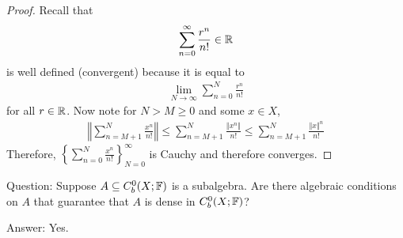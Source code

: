\documentclass{report}
\begin{document}
\begin{proof}
    Recall that 
    \begin{align*}
        \sum_{n=0}^\infty \frac{r^n}{n!} \in \RR
    \end{align*}
    is well defined (convergent) because it is equal to 
    \begin{align*}
        \lim_{N\to \infty} \sum_{n=0}^N \frac{r^n}{n!}
    \end{align*}
    for all $r \in \RR$. Now note for $N  > M \geq 0$ and some $x \in X$,
    \begin{align*}
        \left\Vert \sum_{n=M+1}^N  \frac{x^n}{n!} \right\Vert \leq \sum_{n=M+1}^N \frac{\Vert x^n \Vert}{n!} \leq \sum_{n=M+1}^N \frac{\Vert x \Vert^n}{n!}
    \end{align*}
    Therefore, $\left\{ \sum_{n=0}^N \frac{x^n}{n!} \right\}_{N=0}^\infty$ is Cauchy and therefore converges.
\end{proof}
\noindent Question: Suppose $A \subseteq C^0_b(X; \FF)$ is a subalgebra. Are there algebraic conditions on $A$ that guarantee that $A$ is dense in $C_b^0(X; \FF)$? 

\noindent Answer: Yes.
\end{document}
